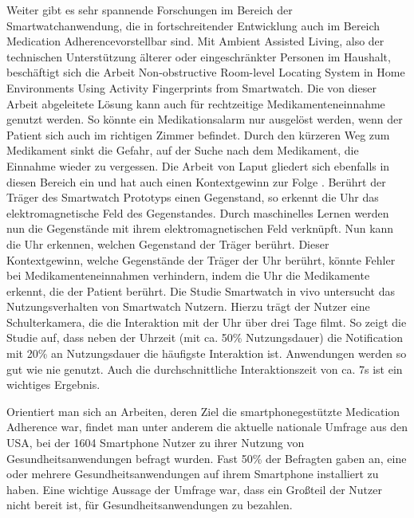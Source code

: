 Weiter gibt es sehr spannende Forschungen im Bereich der Smartwatchanwendung, die in fortschreitender Entwicklung auch im Bereich \glqq Medication Adherence\grqq vorstellbar sind. Mit Ambient Assisted Living, also der technischen Unterstützung älterer oder eingeschränkter Personen im Haushalt, beschäftigt sich die Arbeit \glqq Non-obstructive Room-level Locating System in Home Environments Using Activity Fingerprints from Smartwatch\grqq\cite{Lee:2015:NRL:2750858.2804272}. Die von dieser Arbeit abgeleitete Lösung kann auch für rechtzeitige Medikamenteneinnahme genutzt werden. So könnte ein Medikationsalarm nur ausgelöst werden, wenn der Patient sich auch im richtigen Zimmer befindet. Durch den kürzeren Weg zum Medikament sinkt die Gefahr, auf der Suche nach dem Medikament, die Einnahme wieder zu vergessen. Die Arbeit von Laput gliedert sich ebenfalls in diesen Bereich ein und hat auch einen Kontextgewinn zur Folge \cite{Laput:2015:ETR:2807442.2807481}. Berührt der Träger des  Smartwatch Prototyps einen Gegenstand, so erkennt die Uhr das elektromagnetische Feld des Gegenstandes. Durch maschinelles Lernen werden nun die Gegenstände mit ihrem elektromagnetischen Feld verknüpft. Nun kann die Uhr erkennen, welchen Gegenstand der Träger berührt. Dieser Kontextgewinn, welche Gegenstände der Träger der Uhr berührt, könnte Fehler bei Medikamenteneinnahmen verhindern, indem die Uhr die Medikamente erkennt, die der Patient berührt.
Die Studie \glqq Smartwatch in vivo\grqq \cite{Pizza:2016} untersucht das Nutzungsverhalten von Smartwatch Nutzern. Hierzu trägt der Nutzer eine Schulterkamera, die die Interaktion mit der Uhr über drei Tage filmt. So zeigt die Studie auf, dass neben der Uhrzeit (mit ca. 50\% Nutzungsdauer) die Notification mit 20\% an Nutzungsdauer die häufigste Interaktion ist. Anwendungen werden so gut wie nie genutzt. Auch die durchschnittliche Interaktionszeit von ca. 7s ist ein wichtiges Ergebnis.

Orientiert man sich an Arbeiten, deren Ziel die smartphonegestützte Medication Adherence war, findet man unter anderem die aktuelle nationale Umfrage \cite{Krebs-P:2015aa} aus den USA, bei der 1604 Smartphone Nutzer zu ihrer Nutzung von Gesundheitsanwendungen befragt wurden. Fast 50\% der Befragten gaben an, eine oder mehrere Gesundheitsanwendungen auf ihrem Smartphone installiert zu haben. Eine wichtige Aussage der Umfrage war, dass ein Großteil der Nutzer nicht bereit ist, für Gesundheitsanwendungen zu bezahlen.


